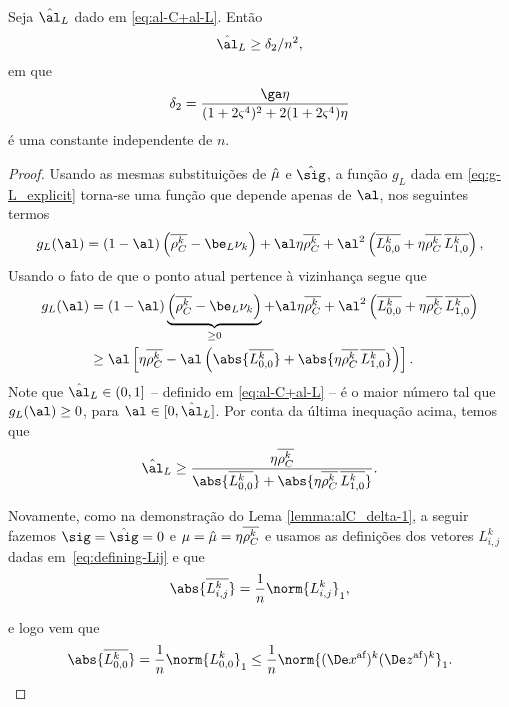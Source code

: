 \begin{lema}\label{lemma:alL_delta-2}
Seja $\nextal_{L}$ dado em \eqref{eq:al-C+al-L}. Então 
\[
\nextal_{L} \geq \delta_{2}/n^{2},
\]em que 
\begin{equation}
	\label{eq:delta2}
	\delta_{2} = \dfrac{\ga\eta } {(1 + 2\bdxzstar^{4})^{2}  + 2(1+2\bdxzstar^{4})\eta}
\end{equation}
é uma constante independente de $n$.
\end{lema}


\begin{proof}

Usando as mesmas substituições de $\hat{\mu}$ e $\nextsig$, a função $g_L$ dada em \eqref{eq:g-L_explicit} torna-se uma função que depende apenas de $\al$, nos seguintes termos 
\[
g_L(\al) =     (1-\al)\left(\rhoCkb  -  \be_L \nuk    \right) +  \al\eta\rhoCkb  + 
   \al^2\left( \dbvec{L_{0,0}^{k}} + \eta\rhoCkb   \,\dbvec{L_{1,0}^{k}}   \right ) ,
	\]
Usando  o fato de que o ponto atual pertence à  vizinhança segue que 
 \[
\begin{aligned}
{g}_L(\al) & =     (1-\al)\underbrace{\left(\rhoCkb  -  \be_L \nuk    \right)}_{\geq 0} +  \al\eta\rhoCkb  + 
   \al^2\left( \dbvec{L_{0,0}^{k}} + \eta\rhoCkb  \, \dbvec{L_{1,0}^{k}}   \right ) \\
   & \geq  \al\left[\eta\rhoCkb  - 
   \al \left(\abs{\dbvec{L_{0,0}^{k}}} + \abs{\eta\rhoCkb\,  \dbvec{L_{1,0}^{k}}}\right)   \right ].
\end{aligned}
 \]
Note que  $\nextal_L\in(0,1]$ -- definido em \eqref{eq:al-C+al-L} -- é o maior número tal que  $g_L(\al)\geq 0$, para  $\al\in[0,\nextal_L]$. Por conta da última inequação acima, temos que 
\begin{equation}
	\label{eq:next-al-ineq}
\nextal_L \geq \frac{\eta\rhoCkb  }{\abs{\dbvec{L_{0,0}^{k}}} + \abs{\eta\rhoCkb \,  \dbvec{L_{1,0}^{k}}}}.
\end{equation}

Novamente, como na demonstração do Lema \ref{lemma:alC_delta-1}, a seguir fazemos $\sig = \nextsig=0$ e  $\mu=\hat{\mu} = \eta\overline{\rho_C^{k}} $ e usamos as definições dos vetores $L_{i,j}^{k}$ dadas em~\eqref{eq:defining-Lij} e que 
\[\abs{\dbvec{L_{i,j}^{k}}} = \frac{1}{n}\norm{L_{i,j}^{k}}_{1},\] 

e logo  vem que  
\begin{equation}
\abs{\dbvec{L_{0,0}^{k}}}  = \frac{1}{n}\norm{L_{0,0}^{k}}_{1}  \leq \dfrac{1}{n} \norm{ \dekx  \dekz }_1 .  \label{eq:bound-zeta}
\end{equation}


\end{proof}
